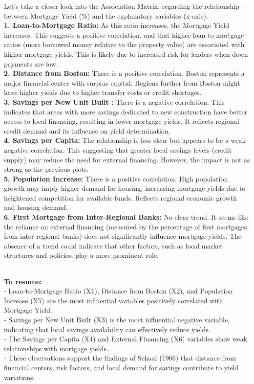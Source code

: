 \documentclass[
  12pt,
]{article}
\begin{document}
Let's take a closer look into the Association Matrix, regarding the
relationship between Mortgage Yield (\%) and the explanatory variables
(x-axis).\\
\textbf{1. Loan-to-Mortgage Ratio:} As this ratio increases, the
Mortgage Yield increases. This suggests a positive correlation, and that
higher loan-to-mortgage ratios (more borrowed money relative to the
property value) are associated with higher mortgage yields. This is
likely due to increased risk for lenders when down payments are low.\\
\textbf{2. Distance from Boston:} There is a positive correlation.
Boston represents a major financial center with surplus capital. Regions
further from Boston might have higher yields due to higher transfer
costs or credit shortages.\\
\textbf{3. Savings per New Unit Built :} There is a negative
correlation. This indicates that areas with more savings dedicated to
new construction have better access to local financing, resulting in
lower mortgage yields. It reflects regional credit demand and its
influence on yield determination.\\
\textbf{4. Savings per Capita:} The relationship is less clear but
appears to be a weak negative correlation. This suggesting that greater
local savings levels (credit supply) may reduce the need for external
financing. However, the impact is not as strong as the previous plots.\\
\textbf{5. Population Increase:} There is a positive correlation. High
population growth may imply higher demand for housing, increasing
mortgage yields due to heightened competition for available funds.
Reflects regional economic growth and housing demand.\\
\textbf{6. First Mortgage from Inter-Regional Banks:} No clear trend. It
seems like the reliance on external financing (measured by the
percentage of first mortgages from inter-regional banks) does not
significantly influence mortgage yields. The absence of a trend could
indicate that other factors, such as local market structures and
policies, play a more prominent role.\\
\strut \\
\textbf{To resume:}\\
- Loan-to-Mortgage Ratio (X1), Distance from Boston (X2), and Population
Increase (X5) are the most influential variables positively correlated
with Mortgage Yield.\\
- Savings per New Unit Built (X3) is the most influential negative
variable, indicating that local savings availability can effectively
reduce yields.\\
- The Savings per Capita (X4) and External Financing (X6) variables show
weak relationships with mortgage yields.\\
- These observations support the findings of Schaaf (1966) that distance
from financial centers, risk factors, and local demand for savings
contribute to yield variations.\\
\end{document}
